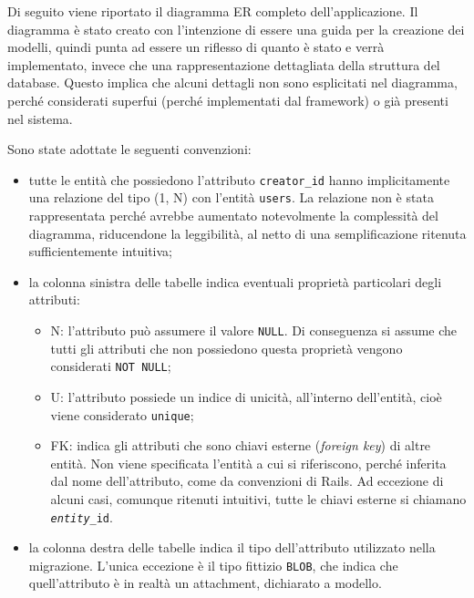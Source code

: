 Di seguito viene riportato il diagramma ER completo dell'applicazione. Il diagramma è stato creato con l'intenzione di essere una guida per la creazione dei modelli, quindi punta ad essere un riflesso di quanto è stato e verrà implementato, invece che una rappresentazione dettagliata della struttura del database. Questo implica che alcuni dettagli non sono esplicitati nel diagramma, perché considerati superfui (perché implementati dal framework) o già presenti nel sistema.

\noindent Sono state adottate le seguenti convenzioni:
\begin{itemize}
	\item tutte le entità che possiedono l'attributo \verb|creator_id| hanno implicitamente una relazione del tipo (1, N) con l'entità \verb|users|. La relazione non è stata rappresentata perché avrebbe aumentato notevolmente la complessità del diagramma, riducendone la leggibilità, al netto di una semplificazione ritenuta sufficientemente intuitiva;
	\item la colonna sinistra delle tabelle indica eventuali proprietà particolari degli attributi:
	\begin{itemize}
		\item N: l'attributo può assumere il valore \verb|NULL|. Di conseguenza si assume che tutti gli attributi che non possiedono questa proprietà vengono considerati \verb|NOT NULL|;
		\item U: l'attributo possiede un indice di unicità, all'interno dell'entità, cioè viene considerato \verb|unique|;
		\item FK: indica gli attributi che sono chiavi esterne (\emph{foreign key}) di altre entità. Non viene specificata l'entità a cui si riferiscono, perché inferita dal nome dell'attributo, come da convenzioni di Rails. Ad eccezione di alcuni casi, comunque ritenuti intuitivi, tutte le chiavi esterne si chiamano \texttt{\emph{entity}\_id}.
	\end{itemize}
	\item la colonna destra delle tabelle indica il tipo dell'attributo utilizzato nella migrazione. L'unica eccezione è il tipo fittizio \verb|BLOB|, che indica che quell'attributo è in realtà un attachment, dichiarato a modello.
\end{itemize}

%
%
